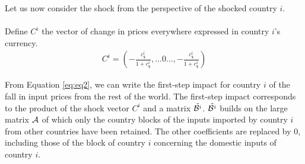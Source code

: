 \documentclass[12pt,a4paper]{paper}
\begin{document}
Let us now consider the shock from the perspective of the shocked country $i$.\\
\\%
%
%
%
Define $C^i$ the vector of change in prices everywhere expressed in country $i$'s currency.\\
\begin{eqnarray*}
C^i = \left(-\frac{c_\$^i}{1+c_\$^i},\ldots0\ldots,-\frac{c_\$^i}{1+c_\$^i} \right)
\end{eqnarray*}

From Equation \ref{eq:eq2}, we can write the first-step impact for country $i$ of the fall in input prices from the rest of the world. 
The first-step impact corresponds to the product of the shock vector $C^i$ and a matrix ${\tilde{{\cal B}^i}}$. ${\tilde{{\cal B}^i}}$ builds on the large matrix ${\cal A}$ of which only the country blocks of the inputs imported by country $i$ from other countries have been retained. 
The other coefficients are replaced by 0, including those of the block of country $i$ concerning the domestic inputs of country $i$. \\
\end{document}
